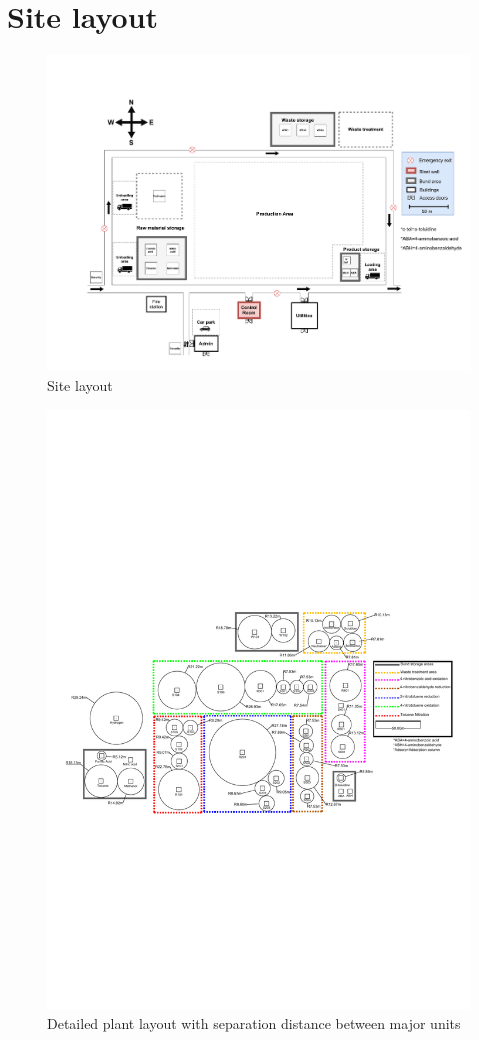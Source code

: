 \section{Site layout}

\begin{figure}[H]
    \centering
    \includegraphics[width=\linewidth]{chapters/Z-support/figures/Plant layout 3.pdf}
    \caption{Site layout}
    \label{fig:site}
\end{figure}

\begin{figure}[H]
    \centering
    \includegraphics[width=\linewidth]{chapters/Z-support/figures/Separation distances 2.pdf}
    \caption{Detailed plant layout with separation distance between major units}
    \label{fig:detailed_layout}
\end{figure}
